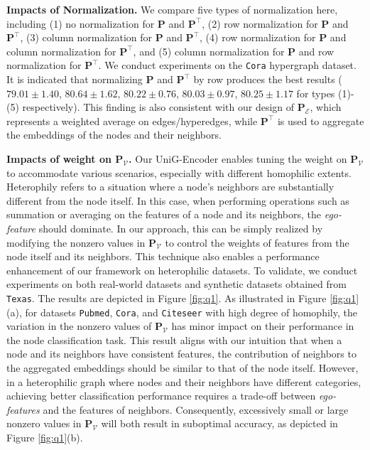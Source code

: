 \documentclass[review]{elsarticle}
\begin{document}
\textbf{Impacts of Normalization.} We compare five types of normalization here, including (1) no normalization for $\mathbf{P}$ and $\mathbf{P}^{\top}$, (2) row normalization for $\mathbf{P}$ and $\mathbf{P}^{\top}$, (3) column normalization for $\mathbf{P}$ and $\mathbf{P}^{\top}$, (4) row normalization for $\mathbf{P}$ and column normalization for $\mathbf{P}^\top$, and (5) column normalization for $\mathbf{P}$ and row normalization for $\mathbf{P}^{\top}$. We conduct experiments on the \texttt{Cora} hypergraph dataset. It is indicated that normalizing $\mathbf{P}$ and $\mathbf{P}^{\top}$ by row produces the best results ($79.01\pm1.40$, $80.64\pm1.62$, $80.22\pm0.76$, $80.03\pm0.97$, $80.25\pm1.17$ for types (1)-(5) respectively). This finding is also consistent with our design of $\mathbf{P}_\mathcal{E}$, which represents a weighted average on edges/hyperedges, while $\mathbf{P}^{\top}$ is used to aggregate the embeddings of the nodes and their neighbors.

\textbf{Impacts of weight on $\mathbf{P}_\mathcal{V}$.} Our UniG-Encoder enables tuning the weight on $\mathbf{P}_\mathcal{V}$ to accommodate various scenarios, especially with different homophilic extents. Heterophily refers to a situation where a node's neighbors are substantially different from the node itself. In this case, when performing operations such as summation or averaging on the features of a node and its neighbors, the \textit{ego-feature} should dominate. In our approach, this can be simply realized by modifying the nonzero values in $\mathbf{P}_\mathcal{V}$ to control the weights of features from the node itself and its neighbors. This technique also enables a performance enhancement of our framework on heterophilic datasets. To validate, we conduct experiments on both real-world datasets and synthetic datasets obtained from \texttt{Texas}. The results are depicted in Figure \ref{fig:q1}. As illustrated in Figure \ref{fig:q1}(a), for datasets \texttt{Pubmed}, \texttt{Cora}, and \texttt{Citeseer} with high degree of homophily, the variation in the nonzero values of $\mathbf{P}_\mathcal{V}$ has minor impact on their performance in the node classification task. This result aligns with our intuition that when a node and its neighbors have consistent features, the contribution of neighbors to the aggregated embeddings should be similar to that of the node itself. However, in a heterophilic graph where nodes and their neighbors have different categories, achieving better classification performance requires a trade-off between \textit{ego-features} and the features of neighbors. Consequently, excessively small or large nonzero values in $\mathbf{P}_\mathcal{V}$ will both result in suboptimal accuracy, as depicted in Figure \ref{fig:q1}(b).
\end{document}
